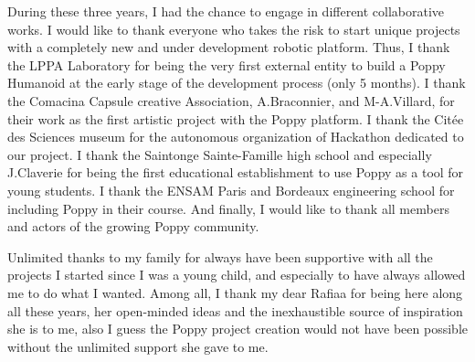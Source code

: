 During these three years, I had the chance to engage in different collaborative works. I would like to thank everyone who takes the risk to start unique projects with a completely new and under development robotic platform. Thus, I thank the LPPA Laboratory for being the very first external entity to build a Poppy Humanoid at the early stage of the development process (only 5 months).
I thank the Comacina Capsule creative Association, A.Braconnier, and M-A.Villard, for their work as the first artistic project with the Poppy platform. I thank the Citée des Sciences museum for the autonomous organization of Hackathon dedicated to our project. I thank the Saintonge Sainte-Famille high school and especially J.Claverie for being the first educational establishment to use Poppy as a tool for young students. I thank the ENSAM Paris and Bordeaux engineering school for including Poppy in their course.
And finally, I would like to thank all members and actors of the growing Poppy community.


Unlimited thanks to my family for always have been supportive with all the projects I started since I was a young child, and especially to have always allowed me to do what I wanted. Among all, I thank my dear Rafiaa for being here along all these years, her open-minded ideas and the inexhaustible source of inspiration she is to me, also I guess the Poppy project creation would not have been possible without the unlimited support she gave to me.
